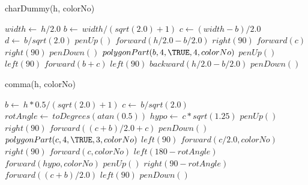 \documentclass[a4paper,10pt]{article}
\begin{document}
\begin{algorithm}
\caption{charDummy(h, colorNo)}
\begin{algorithmic}[5]

\STATE {}
\STATE {}
  \STATE \(width\gets\ h/2.0\)
  \STATE \(b\gets\ width/(sqrt(2.0)+1)\)
  \STATE \(c\gets(width-b)/2.0\)
  \STATE \(d\gets\ b/sqrt(2.0)\)
  \STATE \(penUp()\)
  \STATE \(forward(h/2.0-b/2.0)\)
  \STATE \(right(90)\)
  \STATE \(forward(c)\)
  \STATE \(right(90)\)
  \STATE \(penDown()\)
  \STATE \(polygonPart(b,4,\TRUE,4,colorNo)\)
  \STATE \(penUp()\)
  \STATE \(left(90)\)
  \STATE \(forward(b+c)\)
  \STATE \(left(90)\)
  \STATE \(backward(h/2.0-b/2.0)\)
  \STATE \(penDown()\)

\end{algorithmic}
\end{algorithm}


\begin{algorithm}
\caption{comma(h, colorNo)}
\begin{algorithmic}[5]

\STATE {}
\STATE {}
  \STATE \(b\gets\ h*0.5/(sqrt(2.0)+1)\)
  \STATE \(c\gets\ b/sqrt(2.0)\)
  \STATE \(rotAngle\gets\ toDegrees(atan(0.5))\)
  \STATE \(hypo\gets\ c*sqrt(1.25)\)
  \STATE \(penUp()\)
  \STATE \(right(90)\)
  \STATE \(forward((c+b)/2.0+c)\)
  \STATE \(penDown()\)
  \STATE {}
  \STATE {}
  \STATE \(polygonPart(c,4,\TRUE,3,colorNo)\)
  \STATE \(left(90)\)
  \STATE \(forward(c/2.0,colorNo)\)
  \STATE \(right(90)\)
  \STATE \(forward(c,colorNo)\)
  \STATE \(left(180-rotAngle)\)
  \STATE \(forward(hypo,colorNo)\)
  \STATE \(penUp()\)
  \STATE \(right(90-rotAngle)\)
  \STATE \(forward((c+b)/2.0)\)
  \STATE \(left(90)\)
  \STATE \(penDown()\)

\end{algorithmic}
\end{algorithm}
\end{document}
